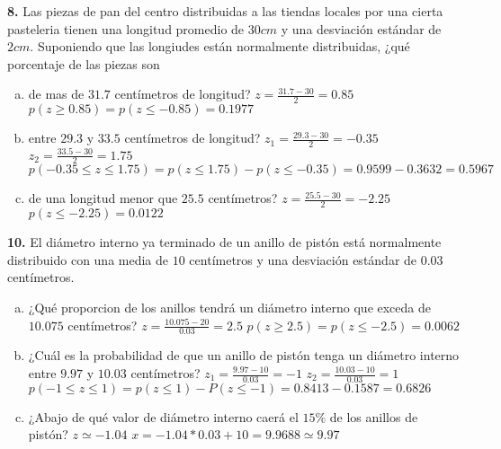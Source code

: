 \documentclass[12pt, letterpaper]{article}
\begin{document}
    \textbf{8. }Las piezas de pan del centro distribuidas a las tiendas locales por una cierta pasteleria tienen una
    longitud promedio de $30cm$ y una desviación estándar de $2cm$. Suponiendo que las longiudes  están normalmente
    distribuidas, ¿qué porcentaje de las piezas son
        \begin{enumerate}[a)]
            \item de mas de $31.7$ centímetros de longitud?\vskip0.5cm
                $z=\displaystyle\frac{31.7-30}{2} = 0.85$\vskip0.5cm
                $p(z\geq 0.85)=p(z\leq -0.85)=0.1977$
            \item entre $29.3$ y $33.5$ centímetros de longitud?\vskip0.5cm
                $z_1=\displaystyle\frac{29.3-30}{2}=-0.35$\vskip0.5cm
                $z_2=\displaystyle\frac{33.5-30}{2}=1.75$\vskip0.5cm
                $p(-0.35\leq z\leq 1.75)=p(z\leq 1.75)-p(z\leq -0.35)=0.9599-0.3632=0.5967$
            \item de una longitud menor que $25.5$ centímetros?\vskip0.5cm
                $z=\displaystyle\frac{25.5-30}{2}=-2.25$\vskip0.5cm
                $p(z\leq -2.25)=0.0122$
        \end{enumerate}\vskip1cm

    \textbf{10. }El diámetro interno ya terminado de un anillo de pistón está normalmente distribuido con una media de $10$
    centímetros y una desviación estándar de $0.03$ centímetros.
        \begin{enumerate}[a)]
            \item ¿Qué proporcion de los anillos tendrá un diámetro interno que exceda de $10.075$ centímetros?\vskip0.5cm
                $z=\displaystyle\frac{10.075-20}{0.03}=2.5$\vskip0.5cm
                $p(z\geq 2.5)=p(z\leq -2.5)=0.0062$
            \item ¿Cuál es la probabilidad de que un anillo de pistón tenga un diámetro interno entre $9.97$ y $10.03$
                    centímetros?\vskip0.5cm
                $z_1=\displaystyle\frac{9.97-10}{0.03}=-1$\vskip0.5cm
                $z_2=\displaystyle\frac{10.03-10}{0.03}=1$\vskip0.5cm
                $p(-1\leq z\leq 1)=p(z\leq 1)-P(z\leq -1)=0.8413-0.1587=0.6826$
            \item ¿Abajo de qué valor de diámetro interno caerá el $15\%$ de los anillos de pistón?\vskip0.5cm
                $z\simeq -1.04$\vskip0.5cm
                $x=-1.04*0.03+10=9.9688\simeq 9.97$
        \end{enumerate}\vskip1cm
\end{document}
